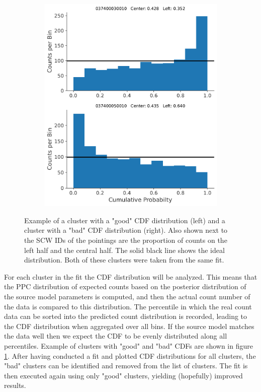 \documentclass{report}
\begin{document}
\begin{figure}[h]
\begin{subfigure}{.5\textwidth}
    \includegraphics[width=.9\linewidth]{Images/PPC_and_Background_Analysis/037400030010_037400050010_cdf.pdf}
  \end{subfigure}
  \caption{Example of a cluster with a "good" CDF distribution (left) and a cluster with a "bad" CDF distribution (right). Also shown next to the SCW IDs of the pointings are the proportion of counts on the left half and the central half. The solid black line shows the ideal distribution. Both of these clusters were taken from the same fit.}
  \label{fig ppc cdf ex good and bad}
  \end{figure}



For each cluster in the fit the CDF distribution will be analyzed. This means that the PPC distribution of expected counts based on the posterior distribution of the source model parameters is computed, and then the actual count number of the data is compared to this distribution. The percentile in which the real count data can be sorted into the predicted count distribution is recorded, leading to the CDF distribution when aggregated over all bins. If the source model matches the data well then we expect the CDF to be evenly distributed along all percentiles. Example of clusters with "good" and "bad" CDFs are shown in figure \ref{fig ppc cdf ex good and bad}. After having conducted a fit and plotted CDF distributions for all clusters, the "bad" clusters can be identified and removed from the list of clusters. The fit is then executed again using only "good" clusters, yielding (hopefully) improved results.
\end{document}
